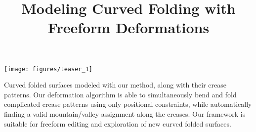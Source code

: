 \documentclass[acmtog,anonymous,review]{acmart}
\begin{document}
\title{Modeling Curved Folding with Freeform Deformations}


\begin{teaserfigure}
  \centering
  \texttt{[image: figures/teaser\_1]}
  \caption{\label{fig:teaser} Curved folded surfaces modeled with our method, along with their crease patterns. Our deformation algorithm is able to simultaneously bend and fold complicated crease patterns using only positional constraints, while automatically finding a valid mountain/valley assignment along the creases. Our framework is suitable for freeform editing and exploration of new curved folded surfaces.
}
\end{teaserfigure}
\begin{abstract}

\end{abstract}
\end{document}
